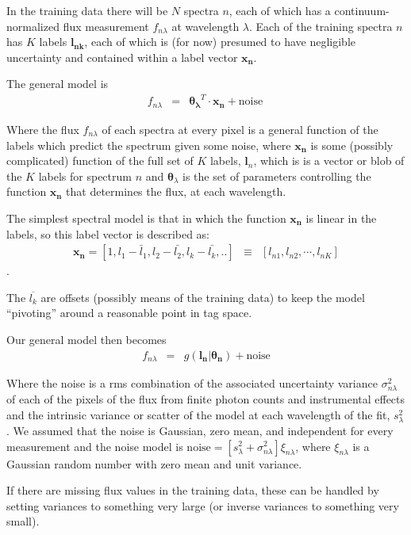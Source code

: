 \documentclass[12pt, preprint]{aastex}
\newcommand{\set}[1]{\bm{#1}}
\newcommand{\mean}[1]{\overline{#1}}
\begin{document}
In the training data there will be $N$ spectra $n$, each of which has
a continuum-normalized flux measurement $f_{n\lambda}$ at wavelength
$\lambda$. Each of the training spectra $n$ has $K$ labels $\boldsymbol{l_{nk}}$, each of which
is (for now) presumed to have negligible uncertainty and contained within a label vector $\boldsymbol{x_n}$.

The general model is
\begin{eqnarray}
f_{n\lambda} &=&
\boldsymbol{\theta_\lambda}^T \cdot \boldsymbol{x_n} + \mbox{noise}
\
\end{eqnarray}

Where the flux $f_{n\lambda}$ of each spectra at every pixel is a general function of the labels which predict the spectrum given some noise, where $\boldsymbol{x_n}$ is some (possibly complicated) function of the full set of $K$ labels, $\set{l}_n$, which is is a vector or blob of the $K$ labels for spectrum $n$ and $\set{\theta}_\lambda$ is the set of parameters controlling the function $\boldsymbol{x_n}$ that determines the flux, at each wavelength.

The simplest spectral model is that in which the function $\boldsymbol{x_n}$ is
linear in the labels, so this label vector is described as:
\begin{eqnarray}
\set{x_n} =  [1, l_1 - \bar{l}_1, l_2 - \bar{l_2}, l_k - \bar{l_k}, .. ] &\equiv& [l_{n1}, l_{n2}, \cdots, l_{nK}]
\end{eqnarray}.

The $\mean{l_k}$ are offsets (possibly means of the training data) to keep the model ``pivoting'' around a reasonable point in tag space.


Our general model then becomes
\begin{eqnarray}
f_{n\lambda} &=&
g(\boldsymbol{l_n} |  \boldsymbol{\theta_n}) + \mbox{noise}
\label{eq:linear}
\end{eqnarray}

Where the noise is a rms combination of the associated uncertainty variance
$\sigma_{n\lambda}^2$ of each of the pixels of the flux from finite photon counts and instrumental effects and the intrinsic variance or scatter of the model at each wavelength of the fit, $s_\lambda^2$. We assumed that the noise is Gaussian, zero mean, and independent for every measurement and the noise model is $\mbox{noise} = [s_\lambda^2+ \sigma_{n\lambda}^2]\xi_{n\lambda}$, where $\xi_{n\lambda}$ is a Gaussian random number with zero mean and unit
variance.

If there are missing flux values in the training data, these can be
handled by setting variances to something very large (or inverse
variances to something very small).
\end{document}
